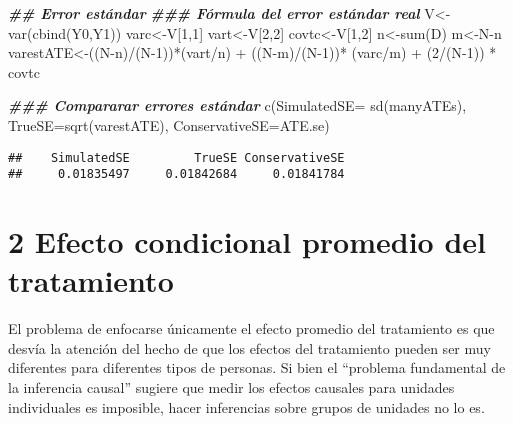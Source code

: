 \documentclass[
]{article}
\newenvironment{Shaded}{\begin{snugshade}}{\end{snugshade}}
\newcommand{\AttributeTok}[1]{\textcolor[rgb]{0.77,0.63,0.00}{#1}}
\newcommand{\DecValTok}[1]{\textcolor[rgb]{0.00,0.00,0.81}{#1}}
\newcommand{\DocumentationTok}[1]{\textcolor[rgb]{0.56,0.35,0.01}{\textbf{\textit{#1}}}}
\newcommand{\FunctionTok}[1]{\textcolor[rgb]{0.00,0.00,0.00}{#1}}
\newcommand{\NormalTok}[1]{#1}
\newcommand{\OtherTok}[1]{\textcolor[rgb]{0.56,0.35,0.01}{#1}}
\newcommand{\SpecialCharTok}[1]{\textcolor[rgb]{0.00,0.00,0.00}{#1}}
\begin{document}
\begin{Shaded}
\begin{Highlighting}[]
\DocumentationTok{\#\# Error estándar}
\DocumentationTok{\#\#\# Fórmula del error estándar real}
\NormalTok{V}\OtherTok{\textless{}{-}}\FunctionTok{var}\NormalTok{(}\FunctionTok{cbind}\NormalTok{(Y0,Y1)) }
\NormalTok{varc}\OtherTok{\textless{}{-}}\NormalTok{V[}\DecValTok{1}\NormalTok{,}\DecValTok{1}\NormalTok{] }
\NormalTok{vart}\OtherTok{\textless{}{-}}\NormalTok{V[}\DecValTok{2}\NormalTok{,}\DecValTok{2}\NormalTok{] }
\NormalTok{covtc}\OtherTok{\textless{}{-}}\NormalTok{V[}\DecValTok{1}\NormalTok{,}\DecValTok{2}\NormalTok{] }
\NormalTok{n}\OtherTok{\textless{}{-}}\FunctionTok{sum}\NormalTok{(D) }
\NormalTok{m}\OtherTok{\textless{}{-}}\NormalTok{N}\SpecialCharTok{{-}}\NormalTok{n }
\NormalTok{varestATE}\OtherTok{\textless{}{-}}\NormalTok{((N}\SpecialCharTok{{-}}\NormalTok{n)}\SpecialCharTok{/}\NormalTok{(N}\DecValTok{{-}1}\NormalTok{))}\SpecialCharTok{*}\NormalTok{(vart}\SpecialCharTok{/}\NormalTok{n) }\SpecialCharTok{+}\NormalTok{ ((N}\SpecialCharTok{{-}}\NormalTok{m)}\SpecialCharTok{/}\NormalTok{(N}\DecValTok{{-}1}\NormalTok{))}\SpecialCharTok{*}\NormalTok{ (varc}\SpecialCharTok{/}\NormalTok{m) }\SpecialCharTok{+}\NormalTok{ (}\DecValTok{2}\SpecialCharTok{/}\NormalTok{(N}\DecValTok{{-}1}\NormalTok{)) }\SpecialCharTok{*}\NormalTok{ covtc }

\DocumentationTok{\#\#\# Compararar errores estándar }
\FunctionTok{c}\NormalTok{(}\AttributeTok{SimulatedSE=} \FunctionTok{sd}\NormalTok{(manyATEs), }\AttributeTok{TrueSE=}\FunctionTok{sqrt}\NormalTok{(varestATE), }\AttributeTok{ConservativeSE=}\NormalTok{ATE.se) }
\end{Highlighting}
\end{Shaded}

\begin{verbatim}
##    SimulatedSE         TrueSE ConservativeSE 
##     0.01835497     0.01842684     0.01841784
\end{verbatim}

\hypertarget{efecto-condicional-promedio-del-tratamiento}{%
\section{2 Efecto condicional promedio del
tratamiento}\label{efecto-condicional-promedio-del-tratamiento}}

El problema de enfocarse únicamente el efecto promedio del tratamiento
es que desvía la atención del hecho de que los efectos del tratamiento
pueden ser muy diferentes para diferentes tipos de personas. Si bien el
``problema fundamental de la inferencia causal'' sugiere que medir los
efectos causales para unidades individuales es imposible, hacer
inferencias sobre grupos de unidades no lo es.
\end{document}
